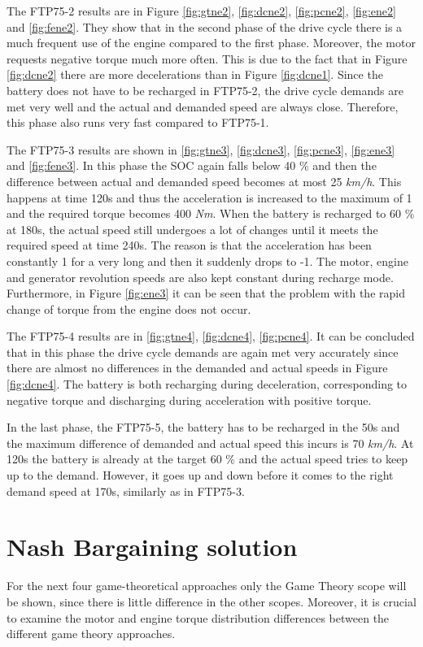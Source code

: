 The FTP75-2 results are in Figure \ref{fig:gtne2}, \ref{fig:dcne2}, \ref{fig:pcne2}, \ref{fig:ene2} and \ref{fig:fene2}. They show that in the second phase of the drive cycle there is a much frequent use of the engine compared to the first phase. Moreover, the motor requests negative torque much more often. This is due to the fact that in Figure \ref{fig:dcne2} there are more decelerations than in Figure \ref{fig:dcne1}. Since the battery does not have to be recharged in FTP75-2, the drive cycle demands are met very well and the actual and demanded speed are always close. Therefore, this phase also runs very fast compared to FTP75-1.

The FTP75-3 results are shown in \ref{fig:gtne3}, \ref{fig:dcne3}, \ref{fig:pcne3}, \ref{fig:ene3} and \ref{fig:fene3}. In this phase the SOC again falls below 40 \% and then the difference between actual and demanded speed becomes at most 25 \textit{km/h}. This happens at time 120s and thus the acceleration is increased to the maximum of 1 and the required torque becomes 400 \textit{Nm}. When the battery is recharged to 60 \% at 180s, the actual speed still undergoes a lot of changes until it meets the required speed at time 240s. The reason is that the acceleration has been constantly 1 for a very long and then it suddenly drops to -1. The motor, engine and generator revolution speeds are also kept constant during recharge mode. Furthermore, in Figure \ref{fig:ene3} it can be seen that the problem with the rapid change of torque from the engine does not occur.

The FTP75-4 results are in \ref{fig:gtne4}, \ref{fig:dcne4}, \ref{fig:pcne4}. It can be concluded that in this phase the drive cycle demands are again met very accurately since there are almost no differences in the demanded and actual speeds in Figure \ref{fig:dcne4}. The battery is both recharging during deceleration, corresponding to negative torque and discharging during acceleration with positive torque.

In the last phase, the FTP75-5, the battery has to be recharged in the 50s and the maximum difference of demanded and actual speed this incurs is 70 \textit{km/h}. At 120s the battery is already at the target 60 \% and the actual speed tries to keep up to the demand. However, it goes up and down before it comes to the right demand speed at 170s, similarly as in FTP75-3. 

\section{Nash Bargaining solution}
For the next four game-theoretical approaches only the Game Theory scope will be shown, since there is little difference in the other scopes. Moreover, it is crucial to examine the motor and engine torque distribution differences between the different game theory approaches.

